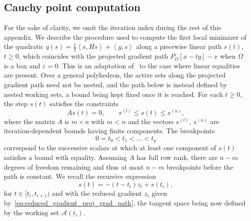 \documentclass[pdflatex,sn-mathphys-num]{sn-jnl}%
\theoremstyle{thmstyleone}%
\newcommand{\calA}{{\mathcal{A}}}
\newcommand{\inner}[2]{\left\langle {#1} , {#2} \right\rangle} %
\newcommand{\proj}[2]{P_{#1} \left[ {#2} \right]} %
\begin{document}
\begin{appendices}

\section{Cauchy point computation}\label{appendix:cauchy_point_computation}

For the sake of clarity, we omit the iteration index during the rest of this appendix. 
We describe the procedure used to compute the first local minimizer of the quadratic $q(s) = \frac{1}{2} \inner{s}{Hs} + \inner{g}{s}$ along a piecewise linear path $s(t)$, $t \ge 0$, which coincides with the projected gradient path $\proj{\Omega}{x-tg}-x$ when $\Omega$ is a box and $\varepsilon = 0$. This is an adaptation of~\cite[Algorithm~17.3.1]{conn-etal:2000} to the case where linear equalities are present. Over a general polyhedron, the active sets along the projected gradient path need not be nested, and the path below is instead defined by nested working sets, a bound being kept fixed once it is reached.
For each $t \ge 0$, the step $s(t)$ satisfies the constraints
\[As(t) = 0, \qquad s^{(l)} \le s(t) \le s^{(u)},\]
where the matrix $A$ is $m\times n$ with $m < n$ and the vectors $s^{(l)}$, $s^{(u)}$ are iteration-dependent bounds having finite components.
The breakpoints
\begin{equation*}
	0=t_0 < t_1 < \ldots < t_p
\end{equation*} 
correspond to the successive scalars at which at least one component of $s(t)$ satisfies a bound with equality. Assuming $A$ has full row rank, there are $n-m$ degrees of freedom remaining and thus at most $n-m$ breakpoints before the path is constant. We recall the recursive expression
\[s(t) = -(t-t_i)z_i + s(t_i),\]
for $t\in [t_i, t_{i+1})$ and with the reduced gradient $z_i$ given by~\eqref{eq:reduced_gradient_proj_grad_path}, the tangent space being now defined by the working set $\calA(t_i)$.


\end{appendices}
\end{document}

